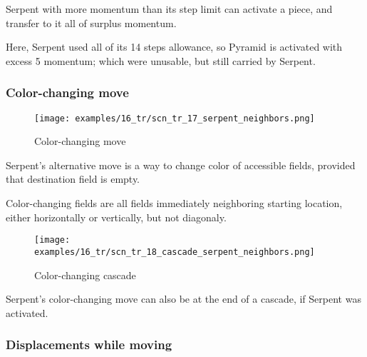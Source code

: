 Serpent with more momentum than its step limit can activate a piece, and
transfer to it all of surplus momentum.

Here, Serpent used all of its 14 steps allowance, so Pyramid is activated with
excess 5 momentum; which were unusable, but still carried by Serpent.

\clearpage %

\subsubsection*{Color-changing move}
\label{sec:Tamoanchan Revisited/Serpent/Movement/Color-changing move}

\noindent
\begin{minipage}{\textwidth}
\begin{wrapfigure}[9]{l}{0.4\textwidth}
\centering
\texttt{[image: examples/16\_tr/scn\_tr\_17\_serpent\_neighbors.png]}
\caption{Color-changing move}
\label{fig:scn_tr_17_serpent_neighbors}
\end{wrapfigure}
Serpent's alternative move is a way to change color of accessible fields,
provided that destination field is empty.

\mbox{}\newline %
Color-changing fields are all fields immediately neighboring starting
location, either horizontally or vertically, but not diagonaly.
\end{minipage}

\vspace*{2.9\baselineskip}
\noindent
\begin{minipage}{\textwidth}
\begin{wrapfigure}[3]{l}{0.4\textwidth}
\centering
\texttt{[image: examples/16\_tr/scn\_tr\_18\_cascade\_serpent\_neighbors.png]}
\caption{Color-changing cascade}
\label{fig:scn_tr_18_cascade_serpent_neighbors}
\end{wrapfigure}
Serpent's color-changing move can also be at the end of a cascade,
if Serpent was activated.
\end{minipage}

\clearpage %

\subsubsection*{Displacements while moving}
\label{sec:Tamoanchan Revisited/Serpent/Movement/Displacements while moving}

